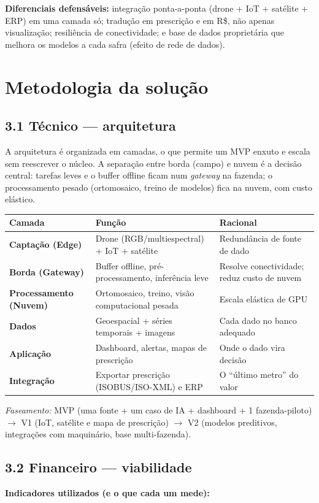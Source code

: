 \documentclass[12pt,a4paper]{article}
\newcommand{\rs}{R\$}
\begin{document}
\textbf{Diferenciais defensáveis:} integração ponta-a-ponta (drone + IoT + satélite + ERP) em uma camada só; tradução em prescrição e em \rs, não apenas visualização; resiliência de conectividade; e base de dados proprietária que melhora os modelos a cada safra (efeito de rede de dados).

\section{Metodologia da solução}
\subsection{3.1 Técnico --- arquitetura}
A arquitetura é organizada em camadas, o que permite um MVP enxuto e escala sem reescrever o núcleo. A separação entre borda (campo) e nuvem é a decisão central: tarefas leves e o buffer offline ficam num \textit{gateway} na fazenda; o processamento pesado (ortomosaico, treino de modelos) fica na nuvem, com custo elástico.

\begin{table}[h]\small\centering
\begin{tabularx}{\textwidth}{>{\bfseries}l X X}
\toprule
\rowcolor{accent!12} Camada & Função & Racional \\
\midrule
Captação (Edge) & Drone (RGB/multiespectral) + IoT + satélite & Redundância de fonte de dado \\
Borda (Gateway) & Buffer offline, pré-processamento, inferência leve & Resolve conectividade; reduz custo de nuvem \\
Processamento (Nuvem) & Ortomosaico, treino, visão computacional pesada & Escala elástica de GPU \\
Dados & Geoespacial + séries temporais + imagens & Cada dado no banco adequado \\
Aplicação & Dashboard, alertas, mapas de prescrição & Onde o dado vira decisão \\
Integração & Exportar prescrição (ISOBUS/ISO-XML) e ERP & O ``último metro'' do valor \\
\bottomrule
\end{tabularx}
\end{table}

\textit{Faseamento:} MVP (uma fonte + um caso de IA + dashboard + 1 fazenda-piloto) $\to$ V1 (IoT, satélite e mapa de prescrição) $\to$ V2 (modelos preditivos, integrações com maquinário, base multi-fazenda).

\subsection{3.2 Financeiro --- viabilidade}
\textbf{Indicadores utilizados (e o que cada um mede):}
\end{document}
